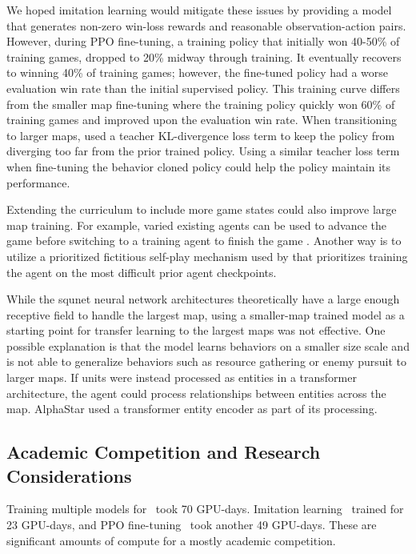 \documentclass[conference]{IEEEtran}
\begin{document}
We hoped imitation learning would mitigate these issues by providing a model that
generates non-zero win-loss rewards and reasonable observation-action pairs.
However, during PPO fine-tuning, a training policy that initially won 40-50\% of
training games, dropped to 20\% midway through training. It eventually recovers to
winning 40\% of training games; however, the fine-tuned policy had a worse evaluation
win rate than the initial supervised policy. This training curve differs from the
smaller map fine-tuning where the training policy quickly won 60\% of
training games and improved upon the evaluation win rate. When transitioning to larger 
maps, \cite{Ferdinand2021doublecone} used a teacher KL-divergence loss term to keep the 
policy from diverging too far from the prior trained policy. Using a similar teacher 
loss term when fine-tuning the behavior cloned policy could help the policy maintain its 
performance.

Extending the curriculum to include more game states could also improve large map
training. For example, varied existing agents can be used to advance the game before
switching to a training agent to finish the game \cite{DBLP:conf/icml/UchenduX0ZYSBFM23}.
Another way is to utilize a prioritized fictitious self-play mechanism used by
\cite{Vinyals2019GrandmasterLI} that prioritizes training the agent on the
most difficult prior agent checkpoints.

While the squnet neural network architectures theoretically have a large enough
receptive field to handle the largest map, using a smaller-map trained model as a
starting point for transfer learning to the largest maps was not effective. One possible
explanation is that the model learns behaviors on a smaller size scale and is not able
to generalize behaviors such as resource gathering or enemy pursuit to larger maps. If
units were instead processed as entities in a transformer architecture, the agent could
process relationships between entities across the map. AlphaStar \cite{Vinyals2019GrandmasterLI} used a transformer
entity encoder as part of its processing.

\subsection{Academic Competition and Research Considerations}
Training multiple models for \agentName\ took 70 GPU-days. Imitation learning \bcAgent\
trained for 23 GPU-days, and PPO fine-tuning \bcPPOAgent\ took another 49 GPU-days. 
These are significant amounts of compute for a mostly academic competition.
\end{document}
